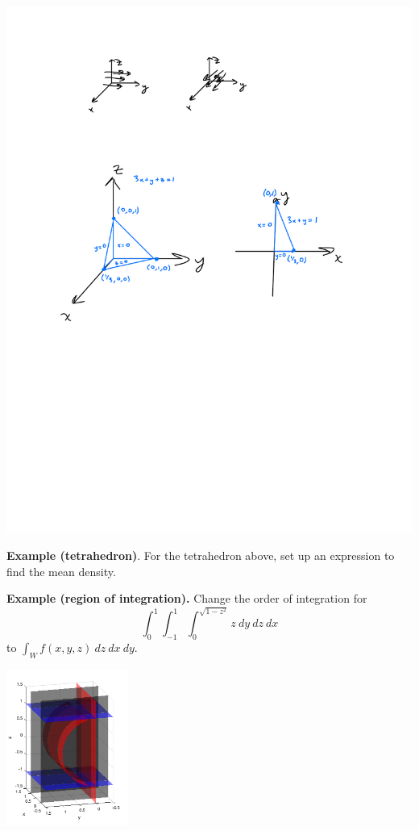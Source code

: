 \documentclass[12pt,letterpaper,noanswers]{exam}
\begin{document}
\includegraphics{img/N18_tetra.pdf}

\vfill


\noindent\textbf{Example (tetrahedron)}. For the tetrahedron above, set up an expression to find the mean density.
\vfill




\eject

\noindent\textbf{Example (region of integration).}  Change the order of integration for \[\int_0^1\int_{-1}^1\int_0^{\sqrt{1-z^2}}z\ dy\ dz\ dx\] to $\displaystyle\int_W f(x,y,z)\ dz\ dx\ dy$. 

\includegraphics[height=2in]{img/C12-3dregion.png}
\end{document}
